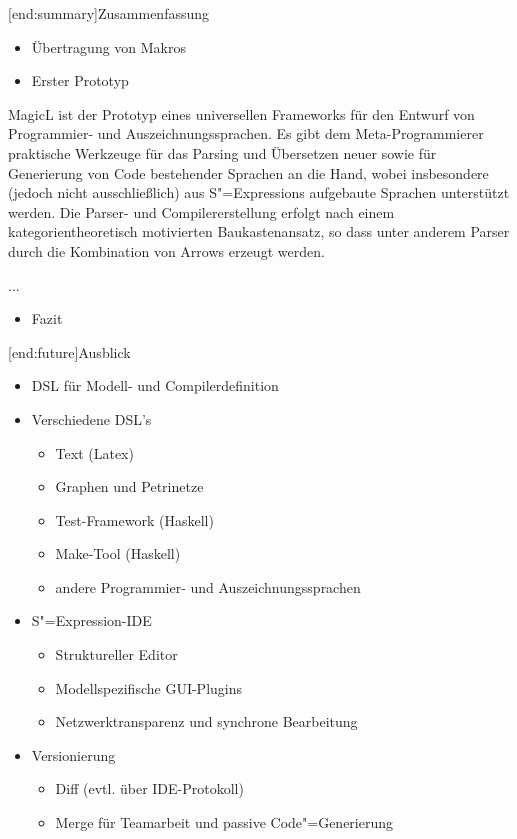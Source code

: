 \documentclass[a4paper, bibgerm]{book}
\newcommand\lsection{}
\newcommand{\sexp}{S"=Expression}
\newcommand{\sexps}{S"=Expressions}
\newcommand{\cgen}{Code"=Generierung}
\begin{document}
\lsection[end:summary]{Zusammenfassung}

\begin{itemize}
\item Übertragung von Makros
\item Erster Prototyp
\end{itemize}

MagicL ist der Prototyp eines
universellen Frameworks für den Entwurf von Programmier- und
Auszeichnungssprachen. Es gibt dem Meta-Programmierer praktische
Werkzeuge für das Parsing und Übersetzen neuer sowie für Generierung von
Code bestehender Sprachen an die Hand, wobei insbesondere (jedoch
nicht ausschließlich) aus \sexps{} aufgebaute Sprachen unterstützt
werden. Die Parser- und Compilererstellung erfolgt nach einem
kategorientheoretisch motivierten Baukastenansatz, so dass
unter anderem Parser durch die Kombination von Arrows erzeugt werden.

...

\begin{itemize}
\item Fazit
\end{itemize}

\lsection[end:future]{Ausblick}
\begin{itemize}
\item DSL für Modell- und Compilerdefinition
\item Verschiedene DSL's
  \begin{itemize}
  \item Text (Latex)
  \item Graphen und Petrinetze
  \item Test-Framework (Haskell)
  \item Make-Tool (Haskell)
  \item andere Programmier- und Auszeichnungssprachen
  \end{itemize}
\item \sexp{}-IDE
  \begin{itemize}
  \item Struktureller Editor
  \item Modellspezifische GUI-Plugins
  \item Netzwerktransparenz und synchrone Bearbeitung
  \end{itemize}
\item Versionierung
  \begin{itemize}
  \item Diff (evtl. über IDE-Protokoll)
  \item Merge für Teamarbeit und passive \cgen{}
  \end{itemize}
\end{itemize}


 
\end{document}
